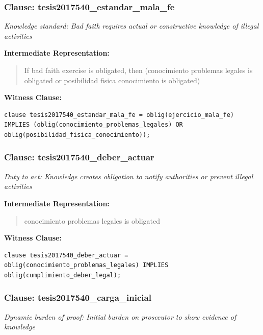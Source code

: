\documentclass[11pt,a4paper]{article}
\begin{document}
\subsubsection{Clause: tesis2017540\_estandar\_mala\_fe}

\textit{Knowledge standard: Bad faith requires actual or constructive knowledge of illegal activities}

\textbf{Intermediate Representation:}

\begin{quote}
If bad faith exercise is obligated, then (conocimiento problemas legales is obligated or posibilidad fisica conocimiento is obligated)
\end{quote}

\textbf{Witness Clause:}

\begin{lstlisting}[style=witnessstyle, language=Witness]
clause tesis2017540_estandar_mala_fe = oblig(ejercicio_mala_fe) IMPLIES (oblig(conocimiento_problemas_legales) OR oblig(posibilidad_fisica_conocimiento));
\end{lstlisting}

\subsubsection{Clause: tesis2017540\_deber\_actuar}

\textit{Duty to act: Knowledge creates obligation to notify authorities or prevent illegal activities}

\textbf{Intermediate Representation:}

\begin{quote}
conocimiento problemas legales is obligated
\end{quote}

\textbf{Witness Clause:}

\begin{lstlisting}[style=witnessstyle, language=Witness]
clause tesis2017540_deber_actuar = oblig(conocimiento_problemas_legales) IMPLIES oblig(cumplimiento_deber_legal);
\end{lstlisting}

\subsubsection{Clause: tesis2017540\_carga\_inicial}

\textit{Dynamic burden of proof: Initial burden on prosecutor to show evidence of knowledge}
\end{document}
